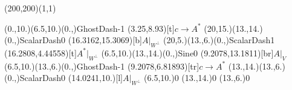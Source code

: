 \unitlength=1bp%

\begin{feynartspicture}(200,200)(1,1)

\FADiagram{}
\FAProp(0.,10.)(6.5,10.)(0.,){GhostDash}{-1}
\FALabel(3.25,8.93)[t]{$c\to A^*$}
\FAProp(20,15.)(13.,14.)(0.,){ScalarDash}{0}
\FALabel(16.3162,15.3069)[b]{$A|_{W^\perp}$}
\FAProp(20,5.)(13.,6.)(0.,){ScalarDash}{1}
\FALabel(16.2808,4.44558)[t]{$A^*|_{W^\perp}$}
\FAProp(6.5,10.)(13.,14.)(0.,){Sine}{0}
\FALabel(9.2078,13.1811)[br]{$A|_V$}
\FAProp(6.5,10.)(13.,6.)(0.,){GhostDash}{-1}
\FALabel(9.2078,6.81893)[tr]{$c\to A^*$}
\FAProp(13.,14.)(13.,6.)(0.,){ScalarDash}{0}
\FALabel(14.0241,10.)[l]{$A|_{W^\perp}$}
\FAVert(6.5,10.){0}
\FAVert(13.,14.){0}
\FAVert(13.,6.){0}
\end{feynartspicture}

